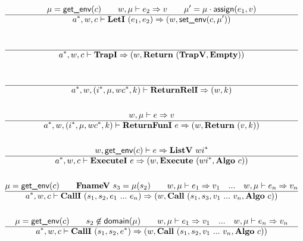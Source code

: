 \begin{gather*}
%
\newline \\
  \mu = \getenv(c) \qquad
  w, \mu \vdash e_2 \Rightarrow v \qquad
  \mu' = \mu \cdot \assign(e_1, v) \\
  \hline
  \seq{a}, w, c \vdash \leti ~ (e_1, e_2)
  \Rightarrow
  (w, \setenv(c, \mu')) \\
%
\newline \\
  \\
  \hline
  \seq{a}, w, c \vdash \trapi \Rightarrow (w, \ret ~ (\trapv, \mt)) \\
%
\newline \\
  \\
  \hline
  \seq{a}, w, (\seq{i}, \mu, wc^*, k) \vdash \returnreli \Rightarrow (w, k) \\
%
\newline \\
  w, \mu \vdash e \Rightarrow v \\
  \hline
  \seq{a}, w, (\seq{i}, \mu, wc^*, k) \vdash \returnfuni ~ e \Rightarrow
  (w, \ret ~ (v, k)) \\
%
\newline \\
  w, \getenv(c) \vdash e \Rightarrow \listv ~ wi^* \\
  \hline
  \seq{a}, w, c \vdash \executei ~ e \Rightarrow
  (w, \exe ~ (wi^*, \algo ~ c)) \\
%
\newline \\
  \mu = \getenv(c) \qquad
  \fnamev ~ s_3 = \mu(s_2) \qquad
  w, \mu \vdash e_1 \Rightarrow v_1 \quad ... \quad
  w, \mu \vdash e_n \Rightarrow v_n \\
  \hline
  \seq{a}, w, c \vdash \calli ~ (s_1, s_2, e_1 ~ ... ~ e_n) \Rightarrow
  (w, \call ~ (s_1, s_3, v_1 ~ ... ~ v_n, \algo ~ c)) \\
%
\newline \\
  \mu = \getenv(c) \qquad
  s_2 \not\in \domain(\mu) \qquad
  w, \mu \vdash e_1 \Rightarrow v_1 \quad ... \quad
  w, \mu \vdash e_n \Rightarrow v_n \\
  \hline
  \seq{a}, w, c \vdash \calli ~ (s_1, s_2, \seq e) \Rightarrow
  (w, \call ~ (s_1, s_2, v_1 ~ ... ~ v_n, \algo ~ c)) \\
%
\newline \\

\end{gather*}
